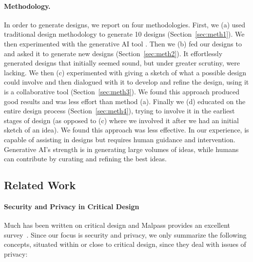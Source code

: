 \paragraph{Methodology.} In order to generate designs, we report on four methodologies. First, we (a) used traditional design methodology to generate 10 designs (Section~\ref{sec:meth1}). We then experimented with the generative AI tool \gpt \gptv. Then we (b) fed our designs to \gpt and asked it to generate new designs (Section~\ref{sec:meth2}). It effortlessly generated designs that initially seemed sound, but under greater scrutiny, were lacking. We then (c) experimented with giving \gpt a sketch of what a possible design could involve and then dialogued with it to develop and refine the design, using it is a collaborative tool (Section~\ref{sec:meth3}). We found this approach produced good results and was less effort than method (a). Finally we (d) educated \gpt on the entire design process (Section~\ref{sec:meth4}), trying to involve it in the earliest stages of design (as opposed to (c) where we involved it after we had an initial sketch of an idea). We found this approach was less effective. In our experience, \gpt is capable of assisting in designs but requires human guidance and intervention. Generative AI's strength is in generating large volumes of ideas, while humans can contribute by curating and refining the best ideas.

\subsection{Related Work}

\paragraph{Security and Privacy in Critical Design}

Much has been written on critical design and Malpass provides an excellent survey~\cite{Mal17}. Since our focus is security and privacy, we only summarize the following concepts, situated within or close to critical design, since they deal with issues of privacy: 

